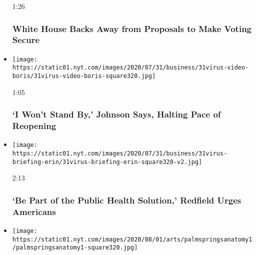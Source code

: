 \begin{itemize}
  1:26

  \hypertarget{white-house-backs-away-from-proposals-to-make-voting-secure}{%
  \subsubsection{White House Backs Away from Proposals to Make Voting
  Secure}\label{white-house-backs-away-from-proposals-to-make-voting-secure}}
\item
  \href{https://www.nytimes.com/video/us/politics/100000007266983/johnson-coronavirus-restrictions.html?action=click\&module=video-series-bar\&region=header\&pgtype=Article\&playlistId=video/latest-video}{}

  \texttt{[image: https://static01.nyt.com/images/2020/07/31/business/31virus-video-boris/31virus-video-boris-square320.jpg]}

  1:05

  \hypertarget{i-wont-stand-by-johnson-says-halting-pace-of-reopening}{%
  \subsubsection{`I Won't Stand By,' Johnson Says, Halting Pace of
  Reopening}\label{i-wont-stand-by-johnson-says-halting-pace-of-reopening}}
\item
  \href{https://www.nytimes.com/video/us/politics/100000007266691/fauci-congress-testimony.html?action=click\&module=video-series-bar\&region=header\&pgtype=Article\&playlistId=video/latest-video}{}

  \texttt{[image: https://static01.nyt.com/images/2020/07/31/business/31virus-briefing-erin/31virus-briefing-erin-square320-v2.jpg]}

  2:13

  \hypertarget{be-part-of-the-public-health-solution-redfield-urges-americans}{%
  \subsubsection{`Be Part of the Public Health Solution,' Redfield Urges
  Americans}\label{be-part-of-the-public-health-solution-redfield-urges-americans}}
\item
  \href{https://www.nytimes.com/video/movies/100000007265338/palm-springs-scene.html?action=click\&module=video-series-bar\&region=header\&pgtype=Article\&playlistId=video/latest-video}{}

  \texttt{[image: https://static01.nyt.com/images/2020/08/01/arts/palmspringsanatomy1/palmspringsanatomy1-square320.jpg]}


\end{itemize}
